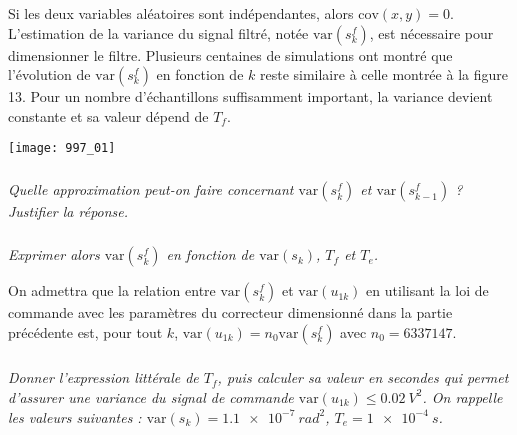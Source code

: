 Si les deux variables aléatoires sont indépendantes, alors $\text{cov}(x,y)=0$.
L’estimation de la variance du signal filtré, notée $\text{var}\left(s_k^f\right)$, est nécessaire pour dimensionner le filtre. Plusieurs centaines de simulations ont montré que l’évolution de $\text{var}\left(s_k^f\right)$ en fonction de $k$ reste similaire à celle montrée à
la figure 13. Pour un nombre d’échantillons suffisamment important, la variance devient constante et sa valeur
dépend de $T_f$.

\begin{center}
\centering
\texttt{[image: 997\_01]}
\end{center}

\subparagraph{}
\textit{Quelle approximation peut-on faire concernant $\text{var}\left(s_k^f\right)$ et $\text{var}\left(s_{k-1}^f\right)$ ? Justifier la réponse.}
\ifprof
\begin{corrige}
\end{corrige}
\else
\fi


\subparagraph{}
\textit{Exprimer alors $\text{var}\left(s_k^f\right)$ en fonction de  $\text{var}\left(s_{k}\right)$, $T_f$ et $T_e$.}
\ifprof
\begin{corrige}
\end{corrige}
\else
\fi


On admettra que la relation entre $\text{var}\left(s_k^f\right)$ et $\text{var}\left(u_{1k}\right)$
en utilisant la loi de commande avec les paramètres du correcteur dimensionné dans la partie précédente est, pour tout $k$, 
$\text{var}\left(u_{1k}\right)=n_0 \text{var}\left(s_{k}^f\right)$ avec $n_0=6337147$.


\subparagraph{}
\textit{Donner l’expression littérale de $T_f$, puis calculer sa valeur en secondes qui permet d’assurer une variance
du signal de commande $\text{var}\left(u_{1k}\right) \leq \SI{0,02}{V^2}$. On rappelle les valeurs suivantes : 
$\text{var}\left(s_{k}\right) =\SI{1,1e-7}{rad^2}$, $T_e = \SI{1e-4}{s}$.}
\ifprof
\begin{corrige}
\end{corrige}
\else
\fi





%
%
%
